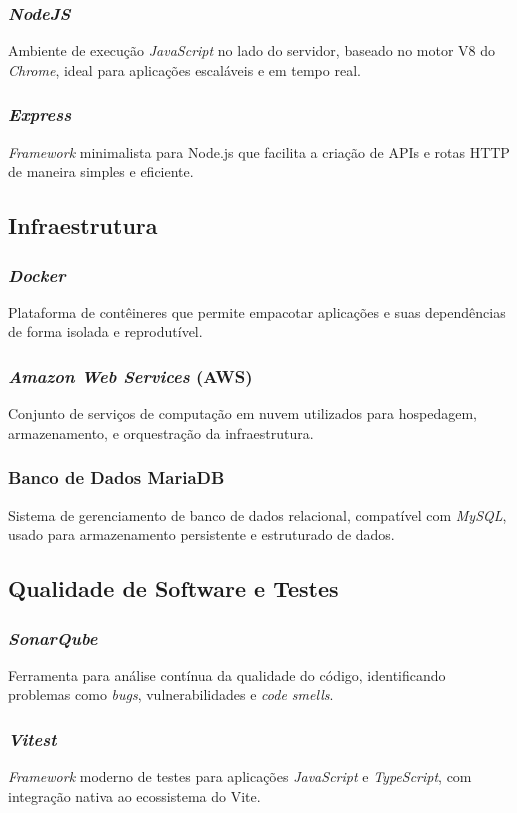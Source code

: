 \subsubsection{\emph{NodeJS}} 
Ambiente de execução \emph{JavaScript} no lado do servidor, baseado no motor V8 do \emph{Chrome}, ideal para aplicações escaláveis e em tempo real.

\subsubsection{\emph{Express}} 
\emph{Framework} minimalista para Node.js que facilita a criação de APIs e rotas HTTP de maneira simples e eficiente.

\subsection{Infraestrutura} 

\subsubsection{\emph{Docker}}
Plataforma de contêineres que permite empacotar aplicações e suas dependências de forma isolada e reprodutível.

\subsubsection{\emph{Amazon Web Services} (AWS)} 
Conjunto de serviços de computação em nuvem utilizados para hospedagem, armazenamento, e orquestração da infraestrutura.

\subsubsection{Banco de Dados MariaDB}
Sistema de gerenciamento de banco de dados relacional, compatível com \emph{MySQL}, usado para armazenamento persistente e estruturado de dados.

\subsection{Qualidade de Software e Testes} 

\subsubsection{\emph{SonarQube}} 
Ferramenta para análise contínua da qualidade do código, identificando problemas como \emph{bugs}, vulnerabilidades e \emph{code smells}.

\subsubsection{\emph{Vitest}}
\emph{Framework} moderno de testes para aplicações \emph{JavaScript} e \emph{TypeScript}, com integração nativa ao ecossistema do Vite.
